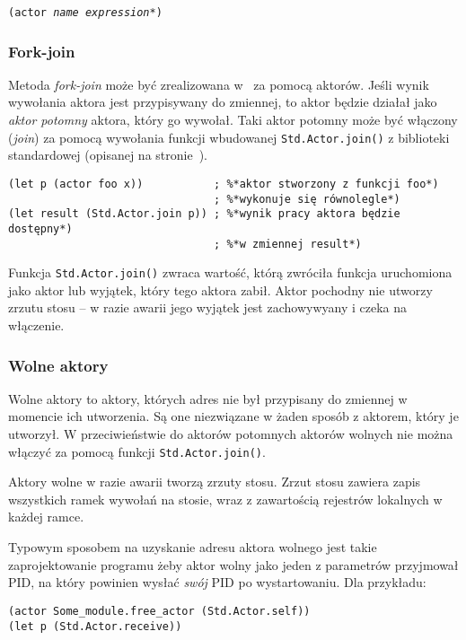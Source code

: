 \texttt{(actor \emph{name} \emph{expression}*)}

\subsubsection{Fork-join}

Metoda \emph{fork-join} może być zrealizowana w \ViuAct\ za pomocą aktorów.
Jeśli wynik wywołania aktora jest przypisywany do zmiennej, to aktor będzie
działał jako \emph{aktor potomny} aktora, który go wywołał. Taki aktor potomny
może być włączony (\emph{join}) za pomocą wywołania funkcji wbudowanej
\texttt{Std.Actor.join()} z biblioteki standardowej (opisanej na
stronie~\pageref{Std_Actor_join}).

\begin{lstlisting}
(let p (actor foo x))           ; %*aktor stworzony z funkcji foo*)
                                ; %*wykonuje się równolegle*)
(let result (Std.Actor.join p)) ; %*wynik pracy aktora będzie dostępny*)
                                ; %*w zmiennej result*)
\end{lstlisting}

Funkcja \texttt{Std.Actor.join()} zwraca wartość, którą zwróciła funkcja
uruchomiona jako aktor lub wyjątek, który tego aktora zabił. Aktor pochodny nie
utworzy zrzutu stosu -- w razie awarii jego wyjątek jest zachowywyany i czeka na
włączenie.

\subsubsection{Wolne aktory}

Wolne aktory to aktory, których adres nie był przypisany do zmiennej w momencie ich utworzenia. Są one
niezwiązane w żaden sposób z aktorem, który je utworzył. W przeciwieństwie do aktorów potomnych aktorów
wolnych nie można włączyć za pomocą funkcji \texttt{Std.Actor.join()}.

Aktory wolne w razie awarii tworzą zrzuty stosu. Zrzut stosu zawiera zapis
wszystkich ramek wywołań na stosie, wraz z zawartością rejestrów lokalnych w
każdej ramce.

Typowym sposobem na uzyskanie adresu aktora wolnego jest takie zaprojektowanie programu żeby aktor wolny jako
jeden z parametrów przyjmował PID, na który powinien wysłać \emph{swój} PID po wystartowaniu. Dla przykładu:

\begin{lstlisting}
(actor Some_module.free_actor (Std.Actor.self))
(let p (Std.Actor.receive))
\end{lstlisting}

